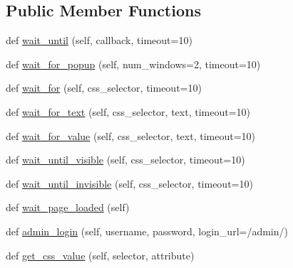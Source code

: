 \subsection*{Public Member Functions}
\begin{DoxyCompactItemize}
\item 
def \mbox{\hyperlink{classdjango_1_1contrib_1_1admin_1_1tests_1_1_admin_selenium_test_case_a02fd30e72ff536ffd536a012867d8dcb}{wait\+\_\+until}} (self, callback, timeout=10)
\item 
def \mbox{\hyperlink{classdjango_1_1contrib_1_1admin_1_1tests_1_1_admin_selenium_test_case_a5421487aee3c9ecd4f107f96b11ec7eb}{wait\+\_\+for\+\_\+popup}} (self, num\+\_\+windows=2, timeout=10)
\item 
def \mbox{\hyperlink{classdjango_1_1contrib_1_1admin_1_1tests_1_1_admin_selenium_test_case_a95e700ae32b0224d1a8f36763506c059}{wait\+\_\+for}} (self, css\+\_\+selector, timeout=10)
\item 
def \mbox{\hyperlink{classdjango_1_1contrib_1_1admin_1_1tests_1_1_admin_selenium_test_case_adc672e69157d7a29f46d5cbd040fbe93}{wait\+\_\+for\+\_\+text}} (self, css\+\_\+selector, text, timeout=10)
\item 
def \mbox{\hyperlink{classdjango_1_1contrib_1_1admin_1_1tests_1_1_admin_selenium_test_case_a9ad33acb2cef59ec3beb5f3a6a5d4111}{wait\+\_\+for\+\_\+value}} (self, css\+\_\+selector, text, timeout=10)
\item 
def \mbox{\hyperlink{classdjango_1_1contrib_1_1admin_1_1tests_1_1_admin_selenium_test_case_ae899ddfb6e7c28a14cce469504316cbc}{wait\+\_\+until\+\_\+visible}} (self, css\+\_\+selector, timeout=10)
\item 
def \mbox{\hyperlink{classdjango_1_1contrib_1_1admin_1_1tests_1_1_admin_selenium_test_case_aa9fdb0203b5534a88701dc9fab4e0d78}{wait\+\_\+until\+\_\+invisible}} (self, css\+\_\+selector, timeout=10)
\item 
def \mbox{\hyperlink{classdjango_1_1contrib_1_1admin_1_1tests_1_1_admin_selenium_test_case_a42e9f478cdeddb125bd7308f1125f93a}{wait\+\_\+page\+\_\+loaded}} (self)
\item 
def \mbox{\hyperlink{classdjango_1_1contrib_1_1admin_1_1tests_1_1_admin_selenium_test_case_a3e612a822bf019937acc285b9490096c}{admin\+\_\+login}} (self, username, password, login\+\_\+url=\textquotesingle{}/admin/\textquotesingle{})
\item 
def \mbox{\hyperlink{classdjango_1_1contrib_1_1admin_1_1tests_1_1_admin_selenium_test_case_ab611a4364e4a8733b965f7f21f7bcdd8}{get\+\_\+css\+\_\+value}} (self, selector, attribute)

\end{DoxyCompactItemize}

